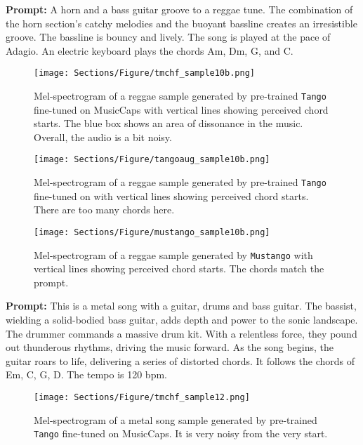 \documentclass[11pt]{article}
\newcommand{\model}{\texttt{Mustango}}
\begin{document}
\textbf{Prompt:} A horn and a bass guitar groove to a reggae tune. The combination of the horn section's catchy melodies and the buoyant bassline creates an irresistible groove. The bassline is bouncy and lively. The song is played at the pace of Adagio. An electric keyboard plays the chords Am, Dm, G, and C.




\begin{figure}[h]
    \centering
    \texttt{[image: Sections/Figure/tmchf\_sample10b.png]}
    \caption{Mel-spectrogram of a reggae sample generated by pre-trained \texttt{Tango} fine-tuned on MusicCaps with vertical lines showing perceived chord starts. The blue box shows an area of dissonance in the music. Overall, the audio is a bit noisy.}
    \label{fig:sample_tango1}
\end{figure}

\begin{figure}[h]
    \centering
    \texttt{[image: Sections/Figure/tangoaug\_sample10b.png]}
    \caption{Mel-spectrogram of a reggae sample generated by pre-trained \texttt{Tango} fine-tuned on \dataset{} with vertical lines showing perceived chord starts. There are too many chords here.}
    \label{fig:sample_tangoaug1}
\end{figure}

\begin{figure}[h]
    \centering
    \texttt{[image: Sections/Figure/mustango\_sample10b.png]}
    \caption{Mel-spectrogram of a reggae sample generated by \model{} with vertical lines showing perceived chord starts. The chords match the prompt. }
    \label{fig:sample_mustango1}
\end{figure}


\clearpage
\FloatBarrier

\textbf{Prompt:} This is a metal song with a guitar, drums and bass guitar. The bassist, wielding a solid-bodied bass guitar, adds depth and power to the sonic landscape. The drummer commands a massive drum kit. With a relentless force, they pound out thunderous rhythms, driving the music forward. As the song begins, the guitar roars to life, delivering a series of distorted chords. It follows the chords of Em, C, G, D. The tempo is 120 bpm.




\begin{figure}[h]
    \centering
    \texttt{[image: Sections/Figure/tmchf\_sample12.png]}
    \caption{Mel-spectrogram of a metal song sample generated by pre-trained \texttt{Tango} fine-tuned on MusicCaps. It is very noisy from the very start.}
    \label{fig:sample_tango2}
\end{figure}
\end{document}
